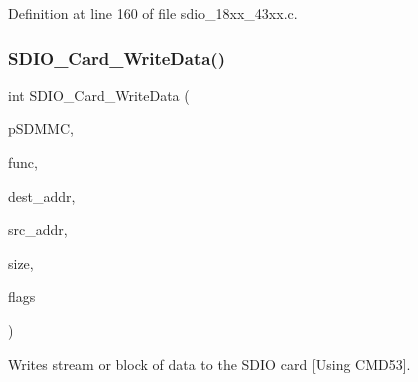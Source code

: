 Definition at line 160 of file sdio\+\_\+18xx\+\_\+43xx.\+c.

\mbox{\label{group___s_d_i_o__18_x_x__43_x_x_gab2b52e00bab2f72ab27fca006c48cf19}} 
\subsubsection{\texorpdfstring{S\+D\+I\+O\+\_\+\+Card\+\_\+\+Write\+Data()}{SDIO\_Card\_WriteData()}}
{\footnotesize\ttfamily int S\+D\+I\+O\+\_\+\+Card\+\_\+\+Write\+Data (\begin{DoxyParamCaption}\item[{\hyperlink{struct_l_p_c___s_d_m_m_c___t}{L\+P\+C\+\_\+\+S\+D\+M\+M\+C\+\_\+T} $\ast$}]{p\+S\+D\+M\+MC,  }\item[{uint32\+\_\+t}]{func,  }\item[{uint32\+\_\+t}]{dest\+\_\+addr,  }\item[{const uint8\+\_\+t $\ast$}]{src\+\_\+addr,  }\item[{uint32\+\_\+t}]{size,  }\item[{uint32\+\_\+t}]{flags }\end{DoxyParamCaption})}



Writes stream or block of data to the S\+D\+IO card \mbox{[}Using C\+M\+D53\mbox{]}. 



